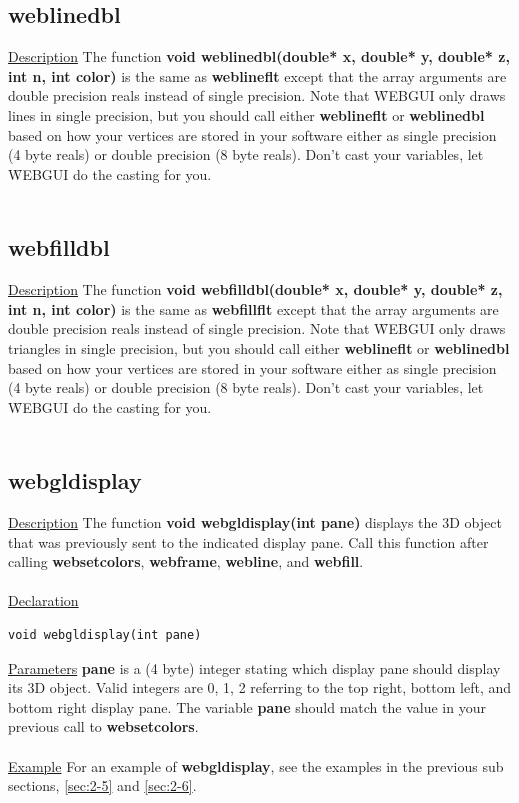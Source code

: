 \newpage
\subsection{weblinedbl}
\underline{Description} The function \textbf{void weblinedbl(double* x, double* y, double* z, int n, int color)} is the same as \textbf{weblineflt} 
except that the array arguments are double precision reals instead of single precision. Note that \f{WEBGUI} only draws lines in single 
precision, but you should call either \textbf{weblineflt} or \textbf{weblinedbl} based on how your vertices are stored in your software either as single 
precision (4 byte reals) or double precision (8 byte reals). Don't cast your variables, let \f{WEBGUI} do the casting for you.\\
\\
\subsection{webfilldbl}
\underline{Description} The function \textbf{void webfilldbl(double* x, double* y, double* z, int n, int color)} is the same as \textbf{webfillflt} 
except that the array arguments are double precision reals instead of single precision. Note that \f{WEBGUI} only draws triangles in single 
precision, but you should call either \textbf{weblineflt} or \textbf{weblinedbl} based on how your vertices are stored in your software either as single 
precision (4 byte reals) or double precision (8 byte reals). Don't cast your variables, let \f{WEBGUI} do the casting for you.\\
\\
\subsection{webgldisplay}
\underline{Description} The function \textbf{void webgldisplay(int pane)} displays the 3D object that was previously sent to the indicated display 
pane. Call this function after calling \textbf{websetcolors}, \textbf{webframe}, \textbf{webline}, and \textbf{webfill}.\\
\\
\underline{Declaration}
\begin{verbatim}
void webgldisplay(int pane)
\end{verbatim}
\underline{Parameters} \textbf{pane} is a (4 byte) integer stating which display pane should display its 3D object. Valid integers are 0, 1, 2 
referring to the top right, bottom left, and bottom right display pane. The variable \textbf{pane} should match the value in your previous call
to \textbf{websetcolors}.\\
\\
\underline{Example} For an example of \textbf{webgldisplay}, see the examples in the previous sub sections, \ref{sec:2-5} and \ref{sec:2-6}.

